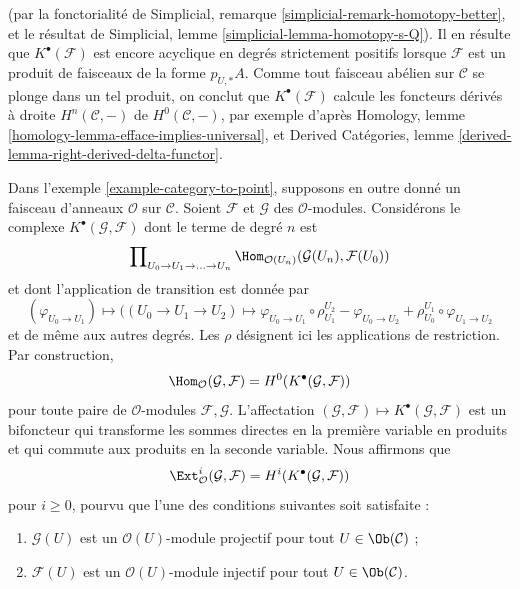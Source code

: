 \begin{example}
(par la fonctorialité de Simplicial, remarque
\ref{simplicial-remark-homotopy-better}, et le résultat de Simplicial, lemme
\ref{simplicial-lemma-homotopy-s-Q}). Il en résulte que
$K^\bullet(\mathcal{F})$ est encore acyclique en degrés strictement positifs
lorsque $\mathcal{F}$ est un produit de faisceaux de la forme $p_{U, *}A$.
Comme tout faisceau abélien sur $\mathcal{C}$ se plonge dans un tel produit,
on conclut que $K^\bullet(\mathcal{F})$ calcule les foncteurs dérivés à droite
$H^n(\mathcal{C}, -)$ de $H^0(\mathcal{C}, -)$, par exemple d'après
Homology, lemme \ref{homology-lemma-efface-implies-universal}, et Derived
Catégories, lemme \ref{derived-lemma-right-derived-delta-functor}.
\end{example}

\begin{example}
\label{example-computing-exts}
Dans l'exemple \ref{example-category-to-point}, supposons en outre donné un
faisceau d'anneaux $\mathcal{O}$ sur $\mathcal{C}$. Soient $\mathcal{F}$ et
$\mathcal{G}$ des $\mathcal{O}$-modules. Considérons le complexe
$K^\bullet(\mathcal{G}, \mathcal{F})$ dont le terme de degré $n$ est
$$
\prod\nolimits_{U_0 \to U_1 \to \ldots \to U_n}
\Hom_{\mathcal{O}(U_n)}(\mathcal{G}(U_n), \mathcal{F}(U_0))
$$
et dont l'application de transition est donnée par
$$
(\varphi_{U_0 \to U_1})
\longmapsto
((U_0 \to U_1 \to U_2) \mapsto
\varphi_{U_0 \to U_1} \circ \rho^{U_2}_{U_1}
- \varphi_{U_0 \to U_2}
+ \rho^{U_1}_{U_0} \circ \varphi_{U_1 \to U_2}
$$
et de même aux autres degrés. Les $\rho$ désignent ici les applications de
restriction. Par construction,
$$
\Hom_\mathcal{O}(\mathcal{G}, \mathcal{F}) =
H^0(K^\bullet(\mathcal{G}, \mathcal{F}))
$$
pour toute paire de $\mathcal{O}$-modules $\mathcal{F}, \mathcal{G}$.
L'affectation
$(\mathcal{G}, \mathcal{F}) \mapsto K^\bullet(\mathcal{G}, \mathcal{F})$
est un bifoncteur qui transforme les sommes directes en la première variable
en produits et qui commute aux produits en la seconde variable. Nous
affirmons que
$$
\Ext^i_\mathcal{O}(\mathcal{G}, \mathcal{F}) =
H^i(K^\bullet(\mathcal{G}, \mathcal{F}))
$$
pour $i \geq 0$, pourvu que l'une des conditions suivantes soit satisfaite :
\begin{enumerate}
\item $\mathcal{G}(U)$ est un $\mathcal{O}(U)$-module projectif pour tout
$U \in \Ob(\mathcal{C})$ ;
\item $\mathcal{F}(U)$ est un $\mathcal{O}(U)$-module injectif pour tout
$U \in \Ob(\mathcal{C})$.
\end{enumerate}

\end{example}
